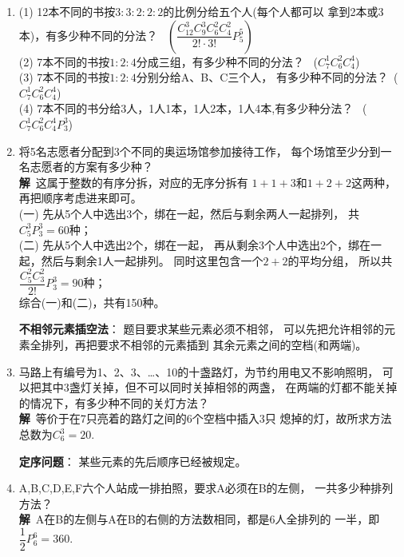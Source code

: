 \begin{enumerate}[label={【\textbf{例\thechapter.\arabic*}】},
 leftmargin=\inteval{\myenumleftmargin}pt,
 itemsep=\inteval{\myenumitempsep}pt,
 itemindent=\inteval{\myenumitemindent}pt]
\textbf{相邻元素捆绑法}： 题目要求某些元素必须相邻，
就可以把相邻的元素捆在一起，当成一个大元素参与排列。
分组与捆绑往往同时出现。

\item (1) 12本不同的书按$3:3:2:2:2$的比例分给五个人(每个人都可以
拿到2本或3本)，有多少种不同的分法？
 \ $\left(\dfrac{C_{12}^3C_9^3C_6^2C_4^2}{2!
    \cdot 3!} P_5^5\right) $ \\
(2) 7本不同的书按$1:2:4$分成三组，有多少种不同的分法？
   \ ($C_7^1C_6^2C_4^4$) \\
(3) 7本不同的书按$1:2:4$分别分给A、B、C三个人，
有多少种不同的分法？\ ($C_7^1C_6^2C_4^4$) \\
(4) 7本不同的书分给3人，1人1本，1人2本，1人4本,有多少种分法？
   \ ($C_7^1C_6^2C_4^4 P_3^3$)


\item 将5名志愿者分配到3个不同的奥运场馆参加接待工作，
每个场馆至少分到一名志愿者的方案有多少种？ \\
\textbf{解}\ 这属于整数的有序分拆，对应的无序分拆有
$1+1+3$和$1+2+2$这两种，再把顺序考虑进来即可。\\
(一) 先从5个人中选出3个，绑在一起，然后与剩余两人一起排列，
共$C_5^3P_3^3=60$种；\\
(二) 先从5个人中选出2个，绑在一起，
再从剩余3个人中选出2个，绑在一起，然后与剩余1人一起排列。
同时这里包含一个$2+2$的平均分组，
所以共$\dfrac{C_5^2C_3^2}{2!}P_3^3=90$种；\\
综合(一)和(二)，共有150种。
\bigskip

\textbf{不相邻元素插空法}： 题目要求某些元素必须不相邻，
可以先把允许相邻的元素全排列，再把要求不相邻的元素插到
其余元素之间的空档(和两端)。

\item 马路上有编号为1、2、3、…、10的十盏路灯，为节约用电又不影响照明，
可以把其中3盏灯关掉，但不可以同时关掉相邻的两盏，
在两端的灯都不能关掉的情况下，有多少种不同的关灯方法？\\
\textbf{解}\ 等价于在7只亮着的路灯之间的6个空档中插入3只
熄掉的灯，故所求方法总数为$  C_6^3= 20 $.
\bigskip

\textbf{定序问题}： 某些元素的先后顺序已经被规定。

\item A,B,C,D,E,F六个人站成一排拍照，要求A必须在B的左侧，
一共多少种排列方法？ \\
\textbf{解}\ A在B的左侧与A在B的右侧的方法数相同，都是6人全排列的
一半，即$\dfrac{1}{2}P_6^6=360$.


\end{enumerate}
